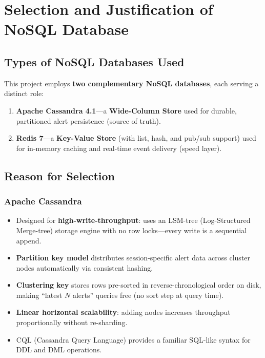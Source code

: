 \documentclass[12pt,a4paper]{report}
\begin{document}
\chapter{Selection and Justification of NoSQL Database}

\section{Types of NoSQL Databases Used}
This project employs \textbf{two complementary NoSQL databases}, each serving
a distinct role:

\begin{enumerate}
  \item \textbf{Apache Cassandra 4.1}---a \textbf{Wide-Column Store} used for
        durable, partitioned alert persistence (source of truth).
  \item \textbf{Redis 7}---a \textbf{Key-Value Store} (with list, hash, and
        pub/sub support) used for in-memory caching and real-time event
        delivery (speed layer).
\end{enumerate}

\section{Reason for Selection}

\subsection{Apache Cassandra}
\begin{itemize}
  \item Designed for \textbf{high-write-throughput}: uses an LSM-tree
        (Log-Structured Merge-tree) storage engine with no row locks---every
        write is a sequential append.
  \item \textbf{Partition key model} distributes session-specific alert data
        across cluster nodes automatically via consistent hashing.
  \item \textbf{Clustering key} stores rows pre-sorted in
        reverse-chronological order on disk, making ``latest $N$ alerts''
        queries free (no sort step at query time).
  \item \textbf{Linear horizontal scalability}: adding nodes increases
        throughput proportionally without re-sharding.
  \item CQL (Cassandra Query Language) provides a familiar SQL-like syntax
        for DDL and DML operations.
\end{itemize}
\end{document}
